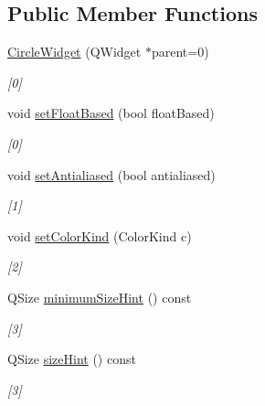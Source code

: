 \subsection*{Public Member Functions}
\begin{DoxyCompactItemize}
\item 
\hypertarget{class_circle_widget_a457a279772f9655749433cc9d6d375d7}{\hyperlink{class_circle_widget_a457a279772f9655749433cc9d6d375d7}{Circle\-Widget} (Q\-Widget $\ast$parent=0)}\label{class_circle_widget_a457a279772f9655749433cc9d6d375d7}

\begin{DoxyCompactList}\small\item\em \mbox{[}0\mbox{]} \end{DoxyCompactList}\item 
void \hyperlink{class_circle_widget_ac69fe4d274d4b3c2df87f3acfa61e583}{set\-Float\-Based} (bool float\-Based)
\begin{DoxyCompactList}\small\item\em \mbox{[}0\mbox{]} \end{DoxyCompactList}\item 
void \hyperlink{class_circle_widget_ad3fc2e4312f4f832fce806167e963c2c}{set\-Antialiased} (bool antialiased)
\begin{DoxyCompactList}\small\item\em \mbox{[}1\mbox{]} \end{DoxyCompactList}\item 
\hypertarget{class_circle_widget_a8d634df7bdacffd407cdb0ca47e8ab67}{void \hyperlink{class_circle_widget_a8d634df7bdacffd407cdb0ca47e8ab67}{set\-Color\-Kind} (Color\-Kind c)}\label{class_circle_widget_a8d634df7bdacffd407cdb0ca47e8ab67}

\begin{DoxyCompactList}\small\item\em \mbox{[}2\mbox{]} \end{DoxyCompactList}\item 
\hypertarget{class_circle_widget_adef54ffc91f67df88c60ffe380ed3691}{Q\-Size \hyperlink{class_circle_widget_adef54ffc91f67df88c60ffe380ed3691}{minimum\-Size\-Hint} () const }\label{class_circle_widget_adef54ffc91f67df88c60ffe380ed3691}

\begin{DoxyCompactList}\small\item\em \mbox{[}3\mbox{]} \end{DoxyCompactList}\item 
Q\-Size \hyperlink{class_circle_widget_ac4305a08d1734e5c79cd1cb86ba3033e}{size\-Hint} () const 
\begin{DoxyCompactList}\small\item\em \mbox{[}3\mbox{]} \end{DoxyCompactList}\end{DoxyCompactItemize}
